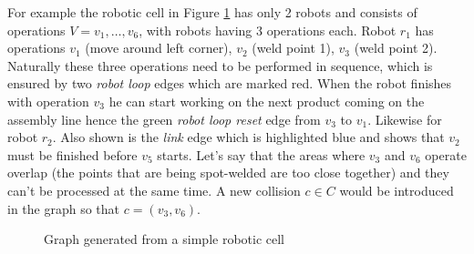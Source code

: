For example the robotic cell in Figure \ref{fig:examplegraph} has only 2 robots and consists of operations $V = v_1, \dots, v_6$, with robots having 3 operations each. 
Robot $r_1$ has operations $v_1$ (move around left corner), $v_2$ (weld point 1), $v_3$ (weld point 2). 
Naturally these three operations need to be performed in sequence, which is ensured by two  \emph{robot loop} edges which are marked red. 
When the robot finishes with operation $v_3$ he can start working on the next product coming on the assembly line hence the green \emph{robot loop reset} edge from $v_3$ to $v_1$.
Likewise for robot $r_2$. 
Also shown is the \emph{link} edge which is highlighted blue and shows that $v_2$ must be finished before $v_5$ starts.
Let's say that the areas where $v_3$ and $v_6$ operate overlap (the points that are being spot-welded are too close together) and they can't be processed at the same time. 
A new collision $c \in C$ would be introduced in the graph so that $c = (v_3, v_6)$.

\begin{figure}
    \centering
    
    \caption{Graph generated from a simple robotic cell}
    \label{fig:examplegraph}
\end{figure}
